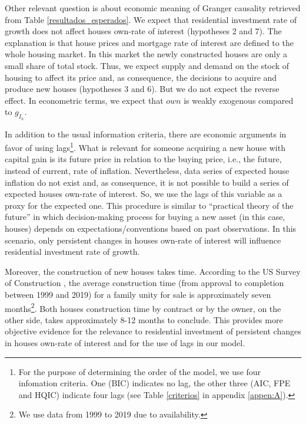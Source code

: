 \documentclass[12pt, a4paper]{article}
\begin{document}




Other relevant question is about economic meaning of Granger causality retrieved from Table \ref{resultados_esperados}.
We expect that residential investment rate of growth does not affect  houses own-rate of interest (hypotheses 2 and 7).
The explanation is that house prices and mortgage rate of interest are defined to the whole housing market.
In this market the newly constructed houses are only a small share of total stock.
Thus, we expect supply and demand on the stock of housing to affect its price and, as consequence,  the decisions to acquire and produce new houses (hypotheses 3 and 6).
But we do not expect the reverse effect.
In econometric terms, we expect that \(own\) is weakly exogenous compared to \(g_{I_{h}}\).

In addition to the usual information criteria, there are economic arguments in favor of using lags\footnote{For the purpose of determining the order of the model, we use four infomation criteria. One (BIC) indicates no lag, the other three (AIC, FPE and HQIC) indicate four lags (see Table \ref{criterios} in appendix \ref{appen:A}).}.
What is relevant for someone acquiring a new house with capital gain is its future price in relation to the buying price, i.e., the future, instead of current, rate of inflation.
Nevertheless, data series of expected house inflation do not exist and, as consequence, it is not possible to build a series of expected houses own-rate of interest.
So, we use the lags of this variable as a proxy for the expected one.
This procedure is similar to \textcite{keynes_general_1937}  ``practical theory of the future'' in which decision-making process for buying a new asset (in this case, houses) depends on expectations/conventions based on past observations.
In this scenario, only persistent changes in houses own-rate of interest will influence residential investment rate of growth.

Moreover, the construction of new houses takes time. According to the US Survey of Construction \cite{SoC_2020}, the average construction time (from approval to completion between 1999 and 2019) for a family unity for sale is approximately seven months\footnote{We use data from 1999 to 2019 due to availability.}.
Both houses construction time by contract or by the owner, on the other side, takes approximately 8-12 months to conclude.
This provides more objective evidence for the relevance to residential investment of persistent changes in houses own-rate of interest and for the use of lags in our model.
\end{document}
